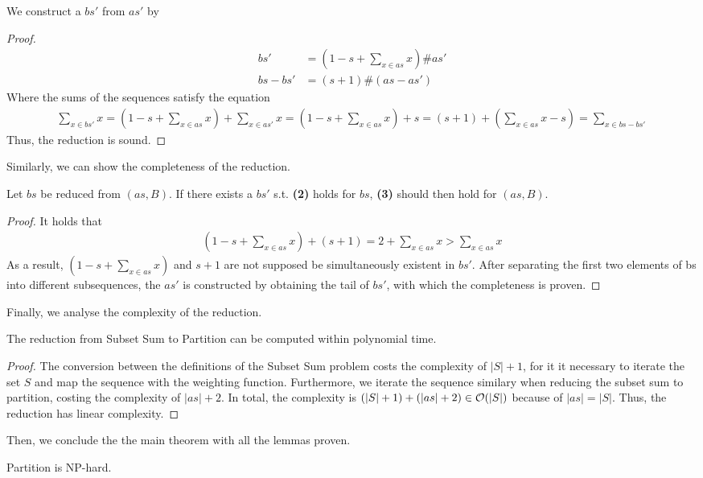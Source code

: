 We construct a $bs'$ from $as'$ by 
\begin{proof}
    \begin{align*}
        bs' &= (1 - s + \sum_{x \in as} x) \# as' \\
        bs - bs' &=  (s + 1) \# (as - as')
    \end{align*}
    Where the sums of the sequences satisfy the equation 
    \begin{align*}
        \sum_{x \in bs'} x = (1 - s + \sum_{x \in as} x) + \sum_{x \in as'} x
        = (1 - s + \sum_{x \in as} x) + s = (s + 1) + (\sum_{x \in as} x - s)
        = \sum_{x \in bs - bs'}
    \end{align*}
    Thus, the reduction is sound.
\end{proof}
Similarly, we can show the completeness of the reduction.
\begin{lemma}[Completeness]
    Let $bs$ be reduced from $(as, B)$. If there exists a $bs'$ s.t. \textbf{(2)} holds for $bs$, 
    \textbf{(3)} should then hold for $(as, B)$.
\end{lemma}
\begin{proof}
    It holds that
\begin{align*}
    (1 - s + \sum_{x \in as} x) + (s + 1) = 2 + \sum_{x \in as} x > \sum_{x \in as} x
\end{align*}
As a result, $(1 - s + \sum_{x \in as} x)$ and $s + 1$ are not supposed be simultaneously existent in $bs'$. 
After separating the first two elements of bs into different subsequences, the $as'$ is constructed 
by obtaining the tail of $bs'$, with which the completeness is proven.
\end{proof} 
Finally, we analyse the complexity of the reduction.
\begin{lemma}
    The reduction from Subset Sum to Partition can be computed within polynomial time.
\end{lemma}
\begin{proof}
The conversion between the definitions of the Subset Sum problem costs the complexity of $|S| + 1$,
for it it necessary to iterate the set $S$ and map the sequence with the weighting function. Furthermore, we iterate the sequence similary when reducing the subset sum to partition, costing
the complexity of $|as| + 2$. In total, the complexity is $(|S| + 1) + (|as| + 2) \in \mathcal{O}({|S|})$  because of $|as| = |S|$.
Thus, the reduction has linear complexity.
\end{proof}
Then, we conclude the the main theorem with all the lemmas proven.
\begin{theorem}
    Partition is NP-hard.
\end{theorem}
